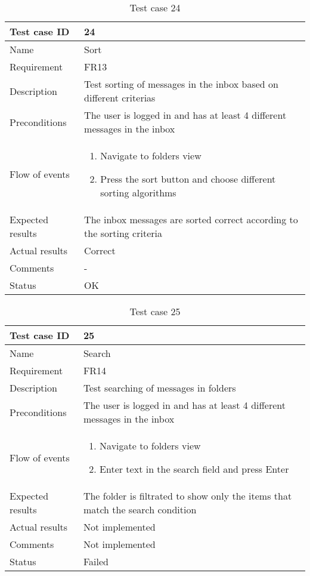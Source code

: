 		\begin{table}
			\begin{tabular}{l|p{10cm}}
				Test case ID & 24 \\ \hline
				Name & Sort\\ \hline
				Requirement & FR13\\ \hline
				Description & Test sorting of messages in the inbox based on different criterias\\ \hline
				Preconditions & The user is logged in and has at least 4 different messages in the inbox\\ \hline
				Flow of events & 
					\begin{enumerate}
						\item{}Navigate to folders view 
						\item{}Press the sort button and choose different sorting algorithms
					\end{enumerate} \\ \hline
				Expected results & The inbox messages are sorted correct according to the sorting criteria\\ \hline
				Actual results &Correct\\ \hline
				Comments &-\\ \hline
				Status &OK \\ \hline
			\end{tabular}
			\caption{Test case 24} \label{tab:case24}
		\end{table}

		\begin{table}
			\begin{tabular}{l|p{10cm}}
				Test case ID & 25 \\ \hline
				Name & Search\\ \hline
				Requirement & FR14\\ \hline
				Description & Test searching of messages in folders\\ \hline
				Preconditions & The user is logged in and has at least 4 different messages in the inbox\\ \hline
				Flow of events & 
					\begin{enumerate}
						\item{}Navigate to folders view 
						\item{}Enter text in the search field and press Enter
					\end{enumerate} \\ \hline
				Expected results & The folder is filtrated to show only the items that match the search condition\\ \hline
				Actual results & Not implemented\\ \hline
				Comments & Not implemented\\ \hline
				Status & Failed\\ \hline
			\end{tabular}
			\caption{Test case 25} \label{tab:case25}
		\end{table}

